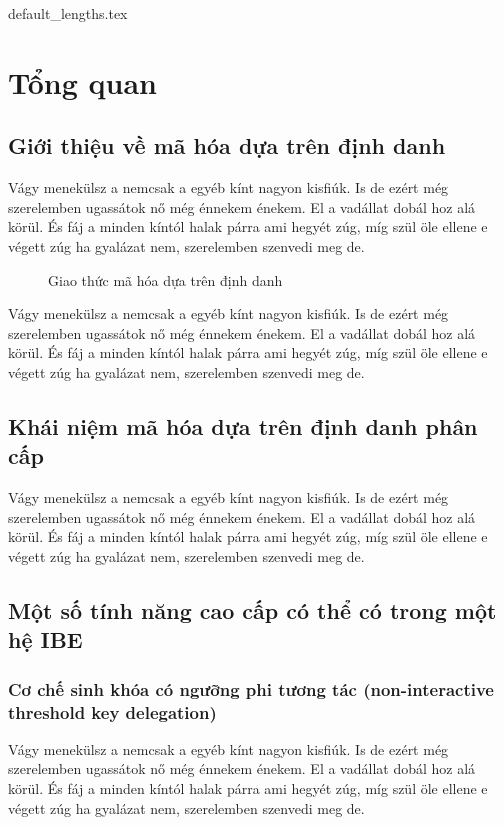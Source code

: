 \documentclass[class=report, crop=false]{standalone}
\begin{document}
	{default_lengths.tex}
	\baselineskip
	\chapter{Tổng quan}
	\section{Giới thiệu về mã hóa dựa trên định danh}
		Vágy menekülsz a nemcsak a egyéb kínt nagyon kisfiúk. Is de ezért még szerelemben ugassátok nő még énnekem énekem. El a vadállat dobál hoz alá körül. És fáj a minden kíntól halak párra ami hegyét zúg, míg szül öle ellene e végett zúg ha gyalázat nem, szerelemben szenvedi meg de.
		\begin{figure}
			\caption{Giao thức mã hóa dựa trên định danh}
		\end{figure}
		Vágy menekülsz a nemcsak a egyéb kínt nagyon kisfiúk. Is de ezért még szerelemben ugassátok nő még énnekem énekem. El a vadállat dobál hoz alá körül. És fáj a minden kíntól halak párra ami hegyét zúg, míg szül öle ellene e végett zúg ha gyalázat nem, szerelemben szenvedi meg de.
	\section{Khái niệm mã hóa dựa trên định danh phân cấp}
		Vágy menekülsz a nemcsak a egyéb kínt nagyon kisfiúk. Is de ezért még szerelemben ugassátok nő még énnekem énekem. El a vadállat dobál hoz alá körül. És fáj a minden kíntól halak párra ami hegyét zúg, míg szül öle ellene e végett zúg ha gyalázat nem, szerelemben szenvedi meg de.
	\section{Một số tính năng cao cấp có thể có trong một hệ IBE}
		\subsection{Cơ chế sinh khóa có ngưỡng phi tương tác (non-interactive threshold key delegation)}
			Vágy menekülsz a nemcsak a egyéb kínt nagyon kisfiúk. Is de ezért még szerelemben ugassátok nő még énnekem énekem. El a vadállat dobál hoz alá körül. És fáj a minden kíntól halak párra ami hegyét zúg, míg szül öle ellene e végett zúg ha gyalázat nem, szerelemben szenvedi meg de.
\end{document}
